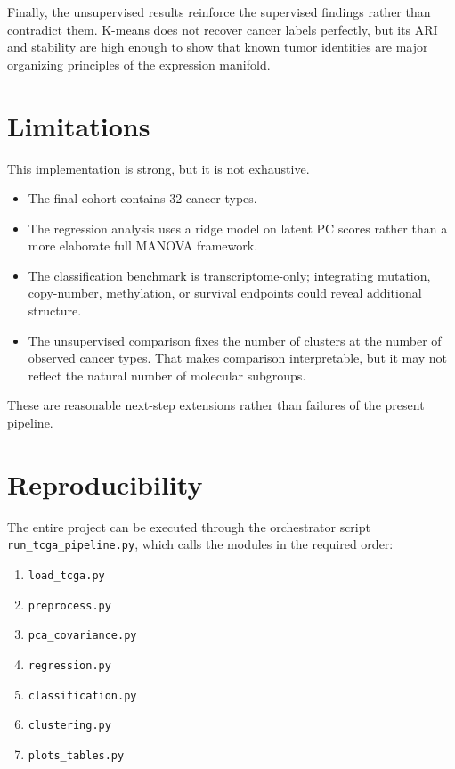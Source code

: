 \documentclass[11pt]{article}
\begin{document}
Finally, the unsupervised results reinforce the supervised findings rather than contradict them. K-means does not recover cancer labels perfectly, but its ARI and stability are high enough to show that known tumor identities are major organizing principles of the expression manifold.

\section{Limitations}
This implementation is strong, but it is not exhaustive.

\begin{itemize}
  \item The final cohort contains 32 cancer types.
  \item The regression analysis uses a ridge model on latent PC scores rather than a more elaborate full MANOVA framework.
  \item The classification benchmark is transcriptome-only; integrating mutation, copy-number, methylation, or survival endpoints could reveal additional structure.
  \item The unsupervised comparison fixes the number of clusters at the number of observed cancer types. That makes comparison interpretable, but it may not reflect the natural number of molecular subgroups.
\end{itemize}

These are reasonable next-step extensions rather than failures of the present pipeline.

\section{Reproducibility}
The entire project can be executed through the orchestrator script \texttt{run\_tcga\_pipeline.py}, which calls the modules in the required order:

\begin{enumerate}
  \item \texttt{load\_tcga.py}
  \item \texttt{preprocess.py}
  \item \texttt{pca\_covariance.py}
  \item \texttt{regression.py}
  \item \texttt{classification.py}
  \item \texttt{clustering.py}
  \item \texttt{plots\_tables.py}
\end{enumerate}
\end{document}

